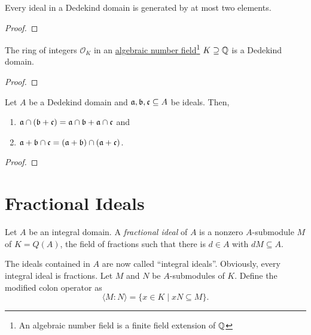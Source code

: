\begin{corollary}
    Every ideal in a Dedekind domain is generated by at most two elements.
\end{corollary}
\begin{proof}
\end{proof}

\begin{theorem}
    The ring of integers $\mathcal{O}_K$ in an \underline{algebraic number field}\footnote{An algebraic number field is a finite field extension of $\mathbb{Q}$} $K\supseteq\mathbb{Q}$ is a Dedekind domain.
\end{theorem}
\begin{proof}
\end{proof}

\begin{proposition}
    Let $A$ be a Dedekind domain and $\mathfrak a,\mathfrak b,\mathfrak c\subseteq A$ be ideals. Then, 
    \begin{enumerate}[label=(\alph*)]
        \item $\mathfrak a\cap(\mathfrak b + \mathfrak c) = \mathfrak a\cap\mathfrak b + \mathfrak a\cap\mathfrak c$ and
        \item $\mathfrak a + \mathfrak b\cap\mathfrak c = (\mathfrak a + \mathfrak b)\cap(\mathfrak a + \mathfrak c)$.
    \end{enumerate}
\end{proposition}
\begin{proof}
    
\end{proof}

\section{Fractional Ideals}


\begin{definition}
    Let $A$ be an integral domain. A \emph{fractional ideal} of $A$ is a nonzero $A$-submodule $M$ of $K = Q(A)$, the field of fractions such that there is $d\in A$ with $dM\subseteq A$.
\end{definition}

The ideals contained in $A$ are now called ``integral ideals''. Obviously, every integral ideal is fractions. Let $M$ and $N$ be $A$-submodules of $K$. Define the modified colon operator as 
\begin{equation*}
    \langle M: N\rangle = \{x\in K\mid xN\subseteq M\}.
\end{equation*}

